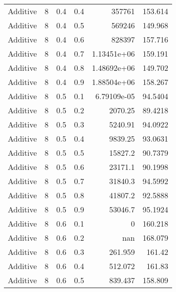 \documentclass{article}
\begin{document}
\begin{longtable}[H]{lrrrrr}
 Additive       &       8 &   0.4 &            0.4 & 357761           &        153.614  \\
 Additive       &       8 &   0.4 &            0.5 & 569246           &        149.968  \\
 Additive       &       8 &   0.4 &            0.6 & 828397           &        157.716  \\
 Additive       &       8 &   0.4 &            0.7 &      1.13451e+06 &        159.191  \\
 Additive       &       8 &   0.4 &            0.8 &      1.48692e+06 &        149.702  \\
 Additive       &       8 &   0.4 &            0.9 &      1.88504e+06 &        158.267  \\
 Additive       &       8 &   0.5 &            0.1 &      6.79109e-05 &         94.5404 \\
 Additive       &       8 &   0.5 &            0.2 &   2070.25        &         89.4218 \\
 Additive       &       8 &   0.5 &            0.3 &   5240.91        &         94.0922 \\
 Additive       &       8 &   0.5 &            0.4 &   9839.25        &         93.0631 \\
 Additive       &       8 &   0.5 &            0.5 &  15827.2         &         90.7379 \\
 Additive       &       8 &   0.5 &            0.6 &  23171.1         &         90.1998 \\
 Additive       &       8 &   0.5 &            0.7 &  31840.3         &         94.5992 \\
 Additive       &       8 &   0.5 &            0.8 &  41807.2         &         92.5888 \\
 Additive       &       8 &   0.5 &            0.9 &  53046.7         &         95.1924 \\
 Additive       &       8 &   0.6 &            0.1 &      0           &        160.218  \\
 Additive       &       8 &   0.6 &            0.2 &    nan           &        168.079  \\
 Additive       &       8 &   0.6 &            0.3 &    261.959       &        161.42   \\
 Additive       &       8 &   0.6 &            0.4 &    512.072       &        161.83   \\
 Additive       &       8 &   0.6 &            0.5 &    839.437       &        158.809  \\

\end{longtable}
\end{document}
